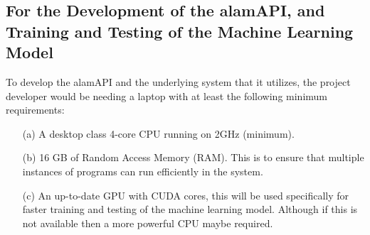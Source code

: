 \subsection{For the Development of the alamAPI, and Training 
and Testing of the Machine Learning Model}
\label{subsec:alamAPI_hardware}
To develop the alamAPI and the underlying system that it utilizes, 
the project developer would be needing a laptop with at least the 
following minimum requirements:
\begin{itemize}
    \item[(a)] A desktop class 4-core CPU running on 2GHz (minimum).
    \item[(b)] 16 GB of Random Access Memory (RAM). 
    This is to ensure that multiple instances of programs 
    can run efficiently in the system.
    \item[(c)] An up-to-date GPU with CUDA cores, this will be used 
    specifically for faster training and testing of the machine learning model. 
    Although if this is not available then a more powerful CPU maybe required.
\end{itemize}